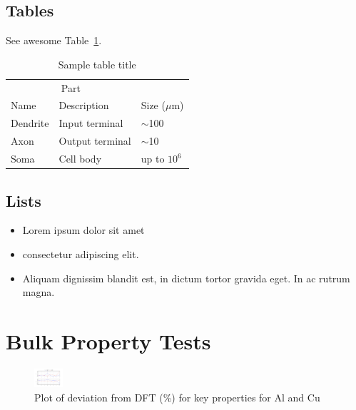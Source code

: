 \documentclass{article}
\begin{document}
\subsection{Tables}
\lipsum[12]
See awesome Table~\ref{tab:table}.

\begin{table}
 \caption{Sample table title}
  \centering
  \begin{tabular}{lll}
    \toprule
    \multicolumn{2}{c}{Part}                   \\
    \cmidrule(r){1-2}
    Name     & Description     & Size ($\mu$m) \\
    \midrule
    Dendrite & Input terminal  & $\sim$100     \\
    Axon     & Output terminal & $\sim$10      \\
    Soma     & Cell body       & up to $10^6$  \\
    \bottomrule
  \end{tabular}
  \label{tab:table}
\end{table}

\subsection{Lists}
\begin{itemize}
\item Lorem ipsum dolor sit amet
\item consectetur adipiscing elit. 
\item Aliquam dignissim blandit est, in dictum tortor gravida eget. In ac rutrum magna.
\end{itemize}



%
%
%
\section{Bulk Property Tests \newline%
}%
\label{sec:BulkPropertyTests}%


\begin{figure}[H]%
\centering%
\includegraphics[width=40px]{./figures/matparam_purestats.png}%
\caption{Plot of deviation from DFT (\%) for key properties for Al and Cu}%
\end{figure}

%
\end{document}
